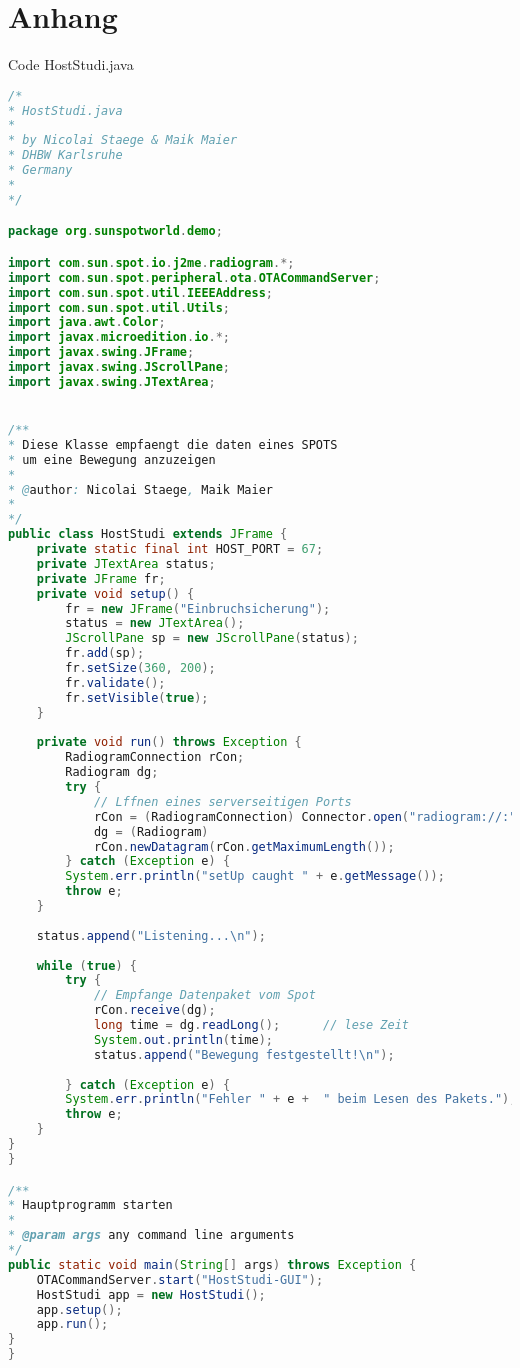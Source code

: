 \chapter*{Anhang}

{\huge Code HostStudi.java}

\begin{lstlisting}[language=Java,caption={Code HostStudi.java}, nolol=true, label=lst:hoststudi,frame=single]
/*
* HostStudi.java
*
* by Nicolai Staege & Maik Maier
* DHBW Karlsruhe
* Germany
*
*/

package org.sunspotworld.demo;

import com.sun.spot.io.j2me.radiogram.*;
import com.sun.spot.peripheral.ota.OTACommandServer;
import com.sun.spot.util.IEEEAddress;
import com.sun.spot.util.Utils;
import java.awt.Color;
import javax.microedition.io.*;
import javax.swing.JFrame;
import javax.swing.JScrollPane;
import javax.swing.JTextArea;


/**
* Diese Klasse empfaengt die daten eines SPOTS
* um eine Bewegung anzuzeigen
* 
* @author: Nicolai Staege, Maik Maier
* 
*/
public class HostStudi extends JFrame {
	private static final int HOST_PORT = 67;
	private JTextArea status;
	private JFrame fr;
	private void setup() {
		fr = new JFrame("Einbruchsicherung");
		status = new JTextArea();
		JScrollPane sp = new JScrollPane(status);
		fr.add(sp);
		fr.setSize(360, 200);
		fr.validate();
		fr.setVisible(true);
	}
	
	private void run() throws Exception {
		RadiogramConnection rCon;
		Radiogram dg;
		try {
			// Lffnen eines serverseitigen Ports
			rCon = (RadiogramConnection) Connector.open("radiogram://:" + HOST_PORT);
			dg = (Radiogram)
			rCon.newDatagram(rCon.getMaximumLength());
		} catch (Exception e) {
		System.err.println("setUp caught " + e.getMessage());
		throw e;
	}
	
	status.append("Listening...\n");
	
	while (true) {
		try {
			// Empfange Datenpaket vom Spot
			rCon.receive(dg);
			long time = dg.readLong();      // lese Zeit
			System.out.println(time);
			status.append("Bewegung festgestellt!\n");
			
		} catch (Exception e) {
		System.err.println("Fehler " + e +  " beim Lesen des Pakets.");
		throw e;
	}
}
}

/**
* Hauptprogramm starten
*
* @param args any command line arguments
*/
public static void main(String[] args) throws Exception {
	OTACommandServer.start("HostStudi-GUI");
	HostStudi app = new HostStudi();
	app.setup();
	app.run();
}
}

\end{lstlisting}
\newpage


